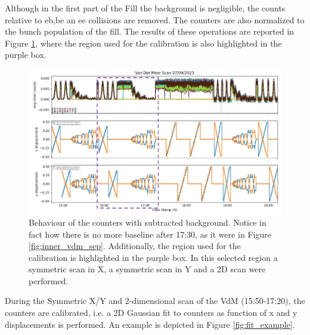 Although in the first part of the Fill the background is negligible, the counts relative to eb,be an ee collisions are removed. The counters are also normalized to the bunch population of the fill. The results of these operations are reported in Figure \ref{fig:bkg_sub_calib}, where the region used for the calibration is also highlighted in the purple box.

\begin{figure}
    \centering
    \includegraphics[width=\textwidth]{figures/calibration_period.png}
    \caption{Behaviour of the counters with subtracted background. Notice in fact how there is no more baseline after 17:30, as it were in Figure \ref{fig:inner_vdm_sep}. Additionally, the region used for the calibration is highlighted in the purple box. In this selected region a symmetric scan in X, a symmetric scan in Y and a 2D scan were performed.}
    \label{fig:bkg_sub_calib}
\end{figure}


During the Symmetric X/Y and 2-dimensional scan of the VdM (15:50-17:20), the counters are calibrated, i.e. a 2D Gaussian fit to counters as function of x and y displacements is performed. An example is depicted in Figure \ref{fig:fit_example}.

